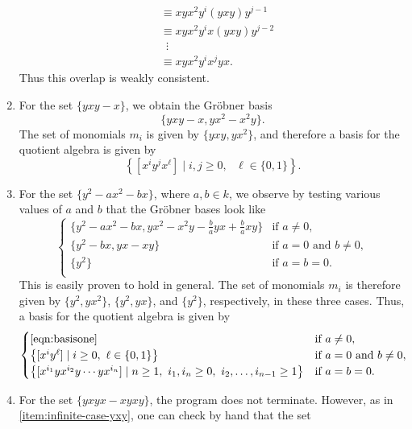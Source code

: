 \begin{enumerate}
\begin{align*}
    	&\equiv xyx^2 y^i (yxy) y^{j-1}\\
    	&\equiv xyx^2 y^i x (yxy) y^{j-2}\\
    	&\hspace{6pt} \vdots\\
    	&\equiv xyx^2 y^i x^j yx.
    \end{align*}
	Thus this overlap is weakly consistent.
	\item For the set $\{yxy-x\}$, we obtain the Gr\"obner basis
	\begin{equation*}
		\{yxy-x,yx^2-x^2y\}.
	\end{equation*}
    The set of monomials $m_i$ is given by $\{yxy,yx^2\}$, and therefore a basis for the quotient algebra is given by
    \begin{equation*}
      \left\{[x^iy^jx^\ell]\mid i,j\ge 0,\text{ }\ell\in\{0,1\}\right\}.
    \end{equation*}
	\item For the set $\{y^2-ax^2-bx\}$, where $a,b\in k$, we observe by testing various values of $a$ and $b$ that the Gr\"obner bases look like
      \begin{equation*}
\begin{cases}
\{y^2-ax^2-bx,yx^2-x^2y-\frac{b}{a}yx+\frac{b}{a}xy\}&\text{if }a\ne 0,\\
\{y^2-bx,yx-xy\}&\text{if }a=0\text{ and }b\ne 0,\\
\{y^2\}&\text{if }a=b=0.\\
\end{cases}
        \end{equation*}
      This is easily proven to hold in general. The set of monomials $m_i$ is therefore given by $\{y^2,yx^2\}$, $\{y^2,yx\}$, and $\{y^2\}$, respectively, in these three cases. Thus, a basis for the quotient algebra is given by
      \begin{equation*}
\begin{cases}
\eqref{eqn:basisone}&\text{if }a\ne 0,\\
\left\{[x^iy^\ell]\mid i\ge 0,\text{ }\ell\in\{0,1\}\right\}&\text{if }a=0\text{ and }b\ne 0,\\
\left\{[x^{i_1}yx^{i_2}y\cdots yx^{i_n}]\mid n\ge 1,\text{ }i_1,i_n\ge 0,\text{ }i_2,\ldots,i_{n-1}\ge 1\right\}&\text{if }a=b=0.\\
\end{cases}
      \end{equation*}
	\item For the set $\{yxyx-xyxy\}$, the program does not terminate. However, as in \eqref{item:infinite-case-yxy}, one can check by hand that the set

\end{enumerate}
